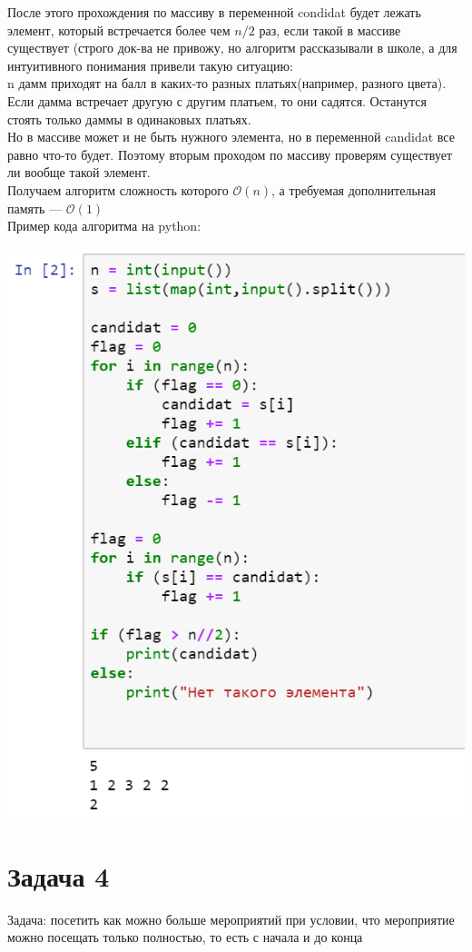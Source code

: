 \documentclass[a4paper,12pt]{article} %
\begin{document}
После этого прохождения по массиву в переменной condidat будет лежать элемент, который встречается более чем $n/2$ раз, если такой в массиве существует (строго док-ва не привожу, но алгоритм рассказывали в школе, а для интуитивного понимания привели такую ситуацию:\\
n дамм приходят на балл в каких-то разных платьях(например, разного цвета). Если дамма встречает другую с другим платьем, то они садятся. Останутся стоять только даммы в одинаковых платьях.\\
Но в массиве может и не быть нужного элемента, но в переменной candidat все равно что-то будет. Поэтому вторым проходом по массиву проверям существует ли вообще такой элемент.\\
Получаем алгоритм сложность которого $\mathcal{O}(n)$, а требуемая дополнительная память — $\mathcal{O}(1)$ \\
Пример кода алгоритма на python: 

\includegraphics{снимок}

\section*{Задача 4}
Задача: посетить как можно больше мероприятий при условии, что мероприятие можно посещать только полностью, то есть с начала и до конца\\
\end{document}
